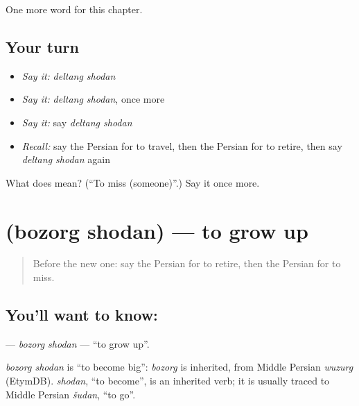 \begin{grammarlens}[title={What you've built}]
One more word for this chapter.
\end{grammarlens}

\subsection*{Your turn}
\begin{itemize}
\raggedright
  \item \emph{Say it:} \emph{deltang shodan}
  \item \emph{Say it:} \emph{deltang shodan}, once more
  \item \emph{Say it:} say \emph{deltang shodan}
  \item \emph{Recall:} say the Persian for to travel, then the Persian for to retire, then say \emph{deltang shodan} again
\end{itemize}

\begin{tcolorbox}[breakable,colback=teal!4,colframe=teal!35!black,title={Before you move on}]
What does   mean? (\textquotedblleft{}To miss (someone)\textquotedblright{}.) Say it once more.
\end{tcolorbox}
\section[\texorpdfstring{\fa{بزرگ} \fa{شدن} (bozorg shodan)}{بزرگ شدن (bozorg shodan)}]{  (bozorg shodan) — to grow up}

\label{lesson:FA-C257-bozorg-shodan}



\begin{quote}
Before the new one: say the Persian for to retire, then the Persian for to miss.
\end{quote}

\subsection*{You'll want to know:  }
\textbf{ } — \emph{bozorg shodan} — \textquotedblleft{}to grow up\textquotedblright{}.

\begin{cousinweb}
\emph{bozorg shodan} is \textquotedblleft{}to become big\textquotedblright{}: \emph{bozorg} is inherited, from Middle Persian \emph{wuzurg} (EtymDB). \emph{shodan}, \textquotedblleft{}to become\textquotedblright{}, is an inherited verb; it is usually traced to Middle Persian \emph{šudan}, \textquotedblleft{}to go\textquotedblright{}.
\end{cousinweb}

